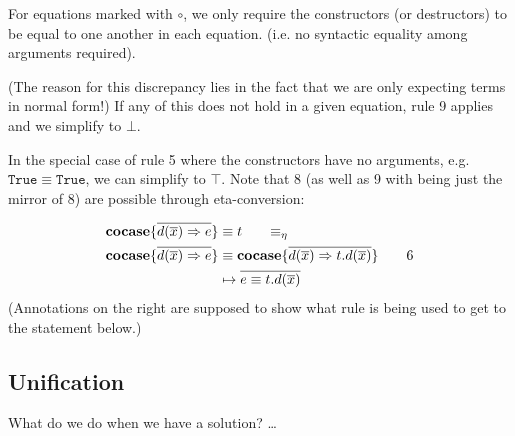 \documentclass[twoside,12pt,a4paper]{article}
\begin{document}
For equations marked with $\circ$, we only require the constructors (or destructors) to be equal to one another in each equation. 
(i.e. no syntactic equality among arguments required).

(The reason for this discrepancy lies in the fact that we are only expecting terms in normal form!)
If any of this does not hold in a given equation, rule 9 applies and we simplify to $\bot$.

In the special case of rule 5 where the constructors have no arguments, e.g. $\mathtt{True \equiv True}$, we can simplify to $\top$.
Note that 8 (as well as 9 with being just the mirror of 8) are possible through eta-conversion:

\begin{align*}
    \excopatmatch{\overline{d(\overline{x})\Rightarrow e}}&\equiv t \tag*{$\equiv_{\eta}$}\\
    \excopatmatch{\overline{d(\overline{x})\Rightarrow e}}&\equiv \excopatmatch{\overline{d(\overline{x})\Rightarrow t.d(\overline{x})}} \tag*{6}\\
    &\mapsto \overline{e \equiv t.d(\overline{x})}
\end{align*}
(Annotations on the right are supposed to show what rule is being used to get to the statement below.)

\subsection{Unification}

What do we do when we have a solution?
\dots
\end{document}

